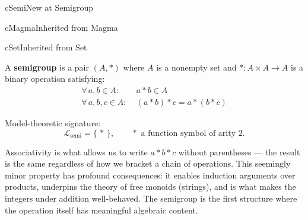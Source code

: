 

\clearpage\thispagestyle{plain}

\begin{bpnew}{cSemi}{New at Semigroup}
\end{bpnew}

\begin{bpinh}{cMagma}{Inherited from Magma}
\end{bpinh}

\begin{bpinh}{cSet}{Inherited from Set}
\end{bpinh}

\begin{definition}[Semigroup]
  A \textbf{semigroup} is a pair $(A, *)$ where $A$ is a nonempty set and
  $* : A \times A \to A$ is a binary operation satisfying:
  \begin{align*}
    \forall\,a,b \in A:&\; a * b \in A \tag{Closure}\\
    \forall\,a,b,c \in A:&\; (a * b) * c = a * (b * c) \tag{Associativity}
  \end{align*}

  \noindent
  Model-theoretic signature:
  \[
    \mathcal{L}_{\mathrm{semi}} = \{\,*\,\},
    \qquad * \text{ a function symbol of arity } 2.
  \]
\end{definition}

\begin{remark}
  Associativity is what allows us to write $a * b * c$ without parentheses —
  the result is the same regardless of how we bracket a chain of operations.
  This seemingly minor property has profound consequences: it enables induction
  arguments over products, underpins the theory of free monoids (strings), and
  is what makes the integers under addition well-behaved.  The semigroup is the
  first structure where the operation itself has meaningful algebraic content.
\end{remark}


